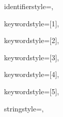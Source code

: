 {%
identifierstyle={\ttfamily\color{black}},

keywordstyle=[1]{\ttfamily\color{dkviolet}},

keywordstyle=[2]{\ttfamily\color{dkgreen}},

keywordstyle=[3]{\ttfamily\color{lightblue}},

keywordstyle=[4]{\ttfamily\color{dkblue}},

keywordstyle=[5]{\ttfamily\color{red}},



stringstyle=\ttfamily,


}
